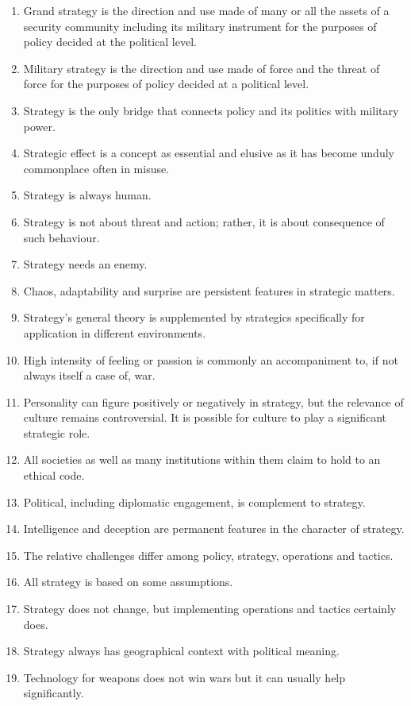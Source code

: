 \begin{enumerate}
	\item Grand strategy is the direction and use made of many or all the assets of a security community including its military instrument for the purposes of policy decided at the political level.
	\item Military strategy is the direction and use made of force and the threat of force for the purposes of policy decided at a political level.
	\item Strategy is the only bridge that connects policy and its politics with military power. 
	\item Strategic effect is a concept as essential and elusive as it has become unduly commonplace often in misuse.
	\item Strategy is always human.
	\item Strategy is not about threat and action; rather, it is about consequence of such behaviour.
	\item Strategy needs an enemy.
	\item Chaos, adaptability and surprise are persistent features in strategic matters.
	\item Strategy’s general theory is supplemented by strategics specifically for application in different environments.
	\item High intensity of feeling or passion is commonly an accompaniment to, if not always itself a case of, war.
	\item Personality can figure positively or negatively in strategy, but the relevance of culture remains controversial. It is possible for culture to play a significant strategic role.
	\item All societies as well as many institutions within them claim to hold to an ethical code. 
	\item Political, including diplomatic engagement, is complement to strategy.
	\item Intelligence and deception are permanent features in the character of strategy.
	\item The relative challenges differ among policy, strategy, operations and tactics.
	\item All strategy is based on some assumptions.
	\item Strategy does not change, but implementing operations and tactics certainly does.
	\item Strategy always has geographical context with political meaning.
	\item Technology for weapons does not win wars but it can usually help significantly.  

\end{enumerate}
